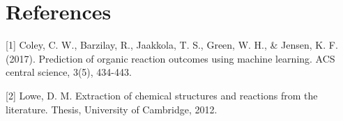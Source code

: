 \documentclass[preprint,12pt]{elsarticle}
\begin{document}
\section*{References}

[1] Coley, C. W., Barzilay, R., Jaakkola, T. S., Green, W. H., & Jensen, K. F. (2017). Prediction of organic reaction outcomes using machine learning. ACS central science, 3(5), 434-443.

[2] Lowe, D. M. Extraction of chemical structures and reactions from the literature. Thesis, University of Cambridge, 2012.





% 

%
%






\end{document}
